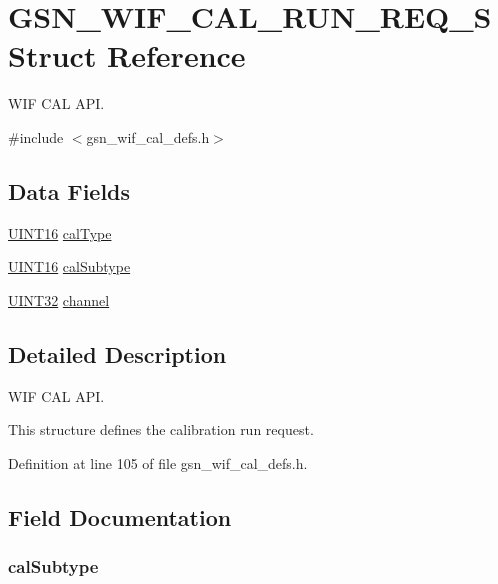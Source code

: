 \hypertarget{a00319}{
\section{GSN\_\-WIF\_\-CAL\_\-RUN\_\-REQ\_\-S Struct Reference}
\label{a00319}
}


WIF CAL API.  




{\ttfamily \#include $<$gsn\_\-wif\_\-cal\_\-defs.h$>$}

\subsection*{Data Fields}
\begin{DoxyCompactItemize}
\item 
\hyperlink{a00660_ga09f1a1fb2293e33483cc8d44aefb1eb1}{UINT16} \hyperlink{a00319_a33f2f5fd3dc581e4f9f46f02e03c5363}{calType}
\item 
\hyperlink{a00660_ga09f1a1fb2293e33483cc8d44aefb1eb1}{UINT16} \hyperlink{a00319_a8a08fa44e329dfbffdbc94a7c562f065}{calSubtype}
\item 
\hyperlink{a00660_gae1e6edbbc26d6fbc71a90190d0266018}{UINT32} \hyperlink{a00319_a3b166120eb9acba31a786d05b6319f90}{channel}
\end{DoxyCompactItemize}


\subsection{Detailed Description}
WIF CAL API. 

This structure defines the calibration run request. 

Definition at line 105 of file gsn\_\-wif\_\-cal\_\-defs.h.



\subsection{Field Documentation}
\hypertarget{a00319_a8a08fa44e329dfbffdbc94a7c562f065}{
\subsubsection[{calSubtype}]{ {\bf calSubtype}}}
\label{a00319_a8a08fa44e329dfbffdbc94a7c562f065}



